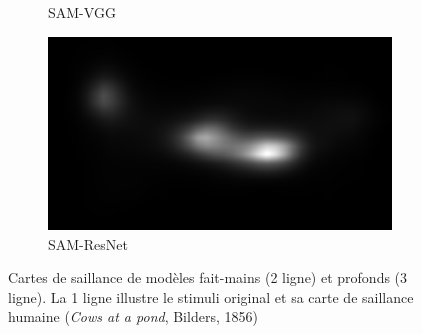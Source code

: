 \begin{figure}[ht]
\begin{subfigure}{0.24\textwidth}
        \caption{SAM-VGG}
    \end{subfigure}
    \begin{subfigure}{0.24\textwidth}
        \includegraphics[width=\linewidth]{datas/predictions/sam_resnet_cows_at_a_pond_Bilders_1856.jpg}
        \caption{SAM-ResNet}
    \end{subfigure}
     
    \caption{Cartes de saillance de modèles fait-mains (2 ligne) et profonds (3 ligne). La 1 ligne illustre le stimuli original et sa carte de saillance humaine (\emph{Cows at a pond}, Bilders, 1856)}
    \label{fig:saliencyModel}
\end{figure}

\vfill

